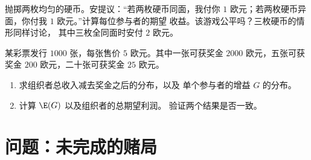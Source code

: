 \begin{exercise}[$\star\star$]\label{exo:g11:prob:10}
抛掷两枚均匀的硬币。安提议：“若两枚硬币同面，我付你
$1$ 欧元；若两枚硬币异面，你付我 $1$ 欧元。”计算每位参与者的期望
收益。该游戏公平吗？三枚硬币的情形同样讨论，
其中三枚全同面时安付 $2$ 欧元。
\end{exercise}

\begin{exercise}[$\star\star\star$]\label{exo:g11:prob:11}
某彩票发行 $1000$ 张，每张售价 $5$ 欧元。其中一张可获奖金
$2000$ 欧元，五张可获奖金 $200$ 欧元，二十张可获奖金 $25$
欧元。
\begin{enumerate}
  \item 求组织者总收入减去奖金之后的分布，以及
        单个参与者的增益 $G$ 的分布。
  \item 计算 $\E(G)$ 以及组织者的总期望利润。
        验证两个结果是否一致。
\end{enumerate}
\end{exercise}

\section{问题：未完成的赌局}

